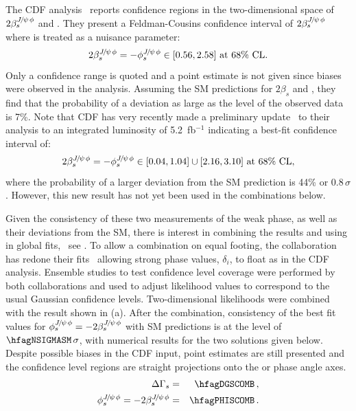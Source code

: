 {The CDF 
analysis~\cite{CDF:2011af,*Aaltonen:2007he_mod,*Aaltonen:2007gf_mod} 
reports confidence regions
in the two-dimensional space of $2\beta_s^{{J\mskip -3mu/\mskip -2mu\psi\mskip 2mu}\phi}$ and \DGs.
They present a Feldman-Cousins confidence interval of $2\beta_s^{{J\mskip -3mu/\mskip -2mu\psi\mskip 2mu}\phi}$
where \DGs is treated as a nuisance parameter:
\begin{equation}
2\beta_s^{{J\mskip -3mu/\mskip -2mu\psi\mskip 2mu}\phi} = -\phi_s^{{J\mskip -3mu/\mskip -2mu\psi\mskip 2mu}\phi} \in [0.56,2.58]~{\mathrm{at~68\%~CL}}.
\end{equation}
Only a confidence range is quoted and a  point 
estimate is not given since biases were observed in the analysis.
Assuming the SM predictions for $2\beta_s$ and \DGs, they find
that the probability of a deviation as large as the level of the 
observed data is 7\%.
Note that CDF has very recently made a preliminary update~\cite{CDFnote10778:2012,*CDFnote10778:2012_cont}
to their
\particle{\Bs \to \jpsi\phi} analysis to an
integrated luminosity of 5.2~fb$^{-1}$ indicating a best-fit
confidence interval of:
\begin{equation}
2\beta_s^{{J\mskip -3mu/\mskip -2mu\psi\mskip 2mu}\phi} = -\phi_s^{{J\mskip -3mu/\mskip -2mu\psi\mskip 2mu}\phi} 
\in [0.04,1.04] \cup [2.16,3.10]~{\mathrm{at~68\%~CL}},
\end{equation}
where the probability
of a larger deviation from the SM prediction is 44\% or $0.8\,\sigma$.
However, this new result has not yet been used in the combinations
below.

Given the consistency of these two measurements of the weak phase,
as well as their
deviations from the SM, there is interest in combining the results and
using in global fits, \eg\ see .
To allow a combination on equal footing, the \dzero collaboration
has redone their fits~\cite{D0web:2009} 
allowing  strong phase values, $\delta_i$, to float
as in the CDF analysis.
Ensemble studies to test confidence level coverage were performed 
by both collaborations and used to adjust likelihood
values to correspond to the usual Gaussian confidence levels. 
Two-dimensional likelihoods were 
combined~\cite{CDFnote9787:2009,D0Note5928:2009}
with the result shown in 
(a).  
After the combination, consistency  
of the best fit values for $\phi_s^{{J\mskip -3mu/\mskip -2mu\psi\mskip 2mu}\phi} = -2\beta_s^{{J\mskip -3mu/\mskip -2mu\psi\mskip 2mu}\phi}$ with
SM predictions is at the level of $\hfagNSIGMASM\,\sigma$, with numerical results
for the two solutions given below.
Despite possible biases in the CDF input, point estimates are still
presented and the confidence level regions are straight projections
onto the \DGs or phase angle axes.
\begin{eqnarray}
\DGs &=& \hfagDGSCOMB \,, \\
\phi_s^{\jpsi\phi} = -2\beta_s^{\jpsi\phi} &=& \hfagPHISCOMB \,.
\end{eqnarray}

}
